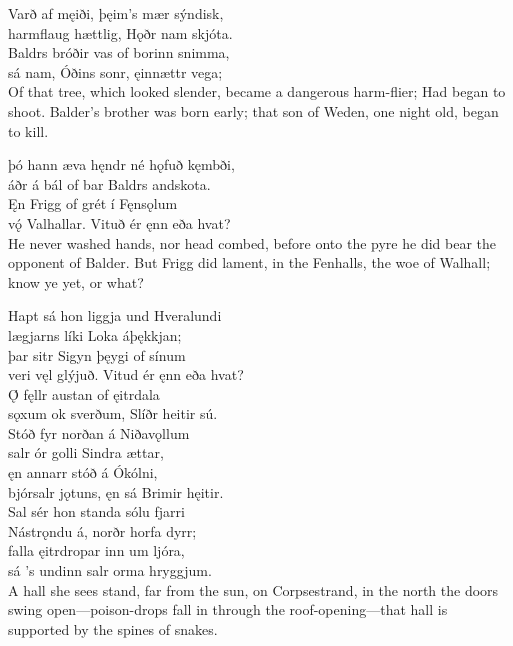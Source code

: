 \bva Varð af męiði, \hld þęim's mær sýndisk, \\%
harmflaug hættlig, \hld Hǫðr nam skjóta. \\%
Baldrs bróðir vas \hld of borinn snimma, \\%
sá nam, Óðins sonr, \hld ęinnættr vega;\\%

\bvb Of that tree, which looked slender, became a dangerous harm-flier; Had began to shoot. Balder's brother was born early; that son of Weden, one night old, began to kill.

\bva þó hann æva hęndr \hld né hǫfuð kęmbði, \\%
áðr á bál of bar \hld Baldrs andskota. \\%
Ęn Frigg of grét \hld í Fęnsǫlum \\%
vǫ́ Valhallar. \hld Vituð ér ęnn eða hvat?\\%

\bvb He never washed hands, nor head combed, before onto the pyre he did bear the opponent of Balder. But Frigg did lament, in the Fenhalls, the woe of Walhall; know ye yet, or what?

\bva Hapt sá hon liggja \hld und Hveralundi \\%
lægjarns líki \hld Loka áþękkjan; \\%
þar sitr Sigyn \hld þęygi of sínum \\%
veri vęl glýjuð. \hld Vitud ér ęnn eða hvat?\\%

\bva Ǫ́ fęllr austan \hld of ęitrdala \\%
sǫxum ok sverðum, \hld Slíðr heitir sú.\\%

\bva Stóð fyr norðan \hld á Niðavǫllum \\%
salr ór golli \hld Sindra ættar, \\%
ęn annarr stóð \hld á Ókólni, \\%
bjórsalr jǫtuns, \hld ęn sá Brimir hęitir.\\%

\bva Sal sér hon standa \hld sólu fjarri \\%
Nástrǫndu á, \hld norðr horfa dyrr; \\%
falla ęitrdropar \hld inn um ljóra, \\%
sá ’s undinn salr \hld orma hryggjum.\\%

\bvb A hall she sees stand, far from the sun, on Corpsestrand, in the north the doors swing open—poison-drops fall in through the roof-opening—that hall is supported by the spines of snakes.

